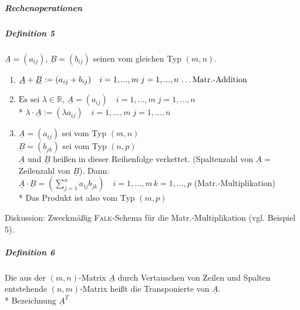 \documentclass[a4paper]{scrartcl}
\begin{document}
\subparagraph{Rechenoperationen}
\subparagraph{Definition 5} $\underline{A} = (a_{ij}), \, \underline{B}=(b_{ij})$ seinen vom gleichen Typ $(m,n)$.
\begin{enumerate}
\item \label{MaRe1} $\underline{A} + \underline{B} := ( a_{ij} + b_{ij})\quad  i=1,...,m  \; j=1,...,n \text{ \dots Matr.-Addition}$
\item\label{MaRe2} $\text{Es sei } \lambda \in \mathbb{R},\, \underline{A} = (a_{ij}) \quad  i=1,...,m  \; j=1,...,n$\\*
$\lambda \cdot \underline{A} := (\lambda a_{ij}) \quad  i=1,...,m  \; j=1,...,n$
\item \label{MaRe3} $\underline{A} = (a_{ij})$ sei vom Typ $(m,n)$\\
$\underline{B} = (b_{jk})$ sei vom Typ $(n,p)$\\
$\underline{A}$ und $\underline{B}$ heißen in dieser Reihenfolge verkettet. (Spaltenzahl von $\underline{A} =$ Zeilenzahl von $\underline{B}$). Dann:\\
$\underline{A} \cdot \underline{B} = ( \sum\limits_{j=1}^n a_{ij} b_{jk} )\quad i=1,...,m \, k=1,...,p$ (Matr.-Multiplikation)\\*
Das Produkt ist also vom Typ $(m,p)$
\end{enumerate}

Diskussion: Zweckmäßig \textsc{Falk}-Schema für die Matr.-Multiplikation (vgl. Beispiel 5).

\subparagraph{Definition 6} Die aus der $(m,n)$-Matrix $\underline{A}$ durch Vertauschen von Zeilen und Spalten entstehende $(n,m)$-Matrix heißt die Transponierte von $\underline{A}$.\\*
Bezeichnung $\underline{A}^T$
\end{document}
